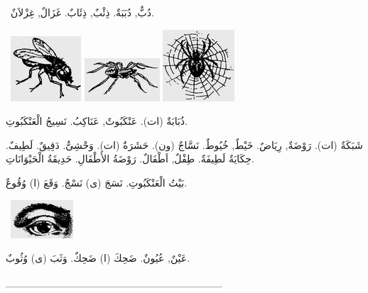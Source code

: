 \documentclass[a5paper]{article}
\begin{document}
\ دُبٌّ, دُبَبَةٌ. ذِئْبٌ, ذِئَابٌ. غَزَالٌ, غِزْلاَنٌ. 

\  \includegraphics[width=1.0311in,height=0.9583in]{MuhammadBagauddinlatinized-img118.png}   \includegraphics[width=1.1043in,height=0.6354in]{MuhammadBagauddinlatinized-img119.png}   \includegraphics[width=1.052in,height=1.052in]{MuhammadBagauddinlatinized-img120.png}  

ذُبَابَةٌ (ات). عَنْكَبُوتٌ, عَنَاكِبُ. نَسِيجُ الْعَنْكَبُوتِ. 

شَبَكَةٌ (ات). رَوْضَةٌ, رِيَاضٌ. خَيْطٌ, خُيُوطٌ. نَسَّاجٌ (ون). حَشَرَةٌ (ات). وَحْشِىٌّ. دَقِيقٌ. لَطِيفٌ. حِكَايَةٌ لَطِيفَةٌ. طِفْلٌ, اَطْفَالٌ. رَوْضَةُ الأَطْفَالِ. حَدِيقَةُ الْحَيْوَانَاتِ. 

بَيْتُ الْعَنْكَبُوتِ. نَسَجَ (ى) نَسْجٌ. وَقَعَ (ا) وُقُوعٌ. 

\  \includegraphics[width=0.9165in,height=0.5626in]{MuhammadBagauddinlatinized-img121.png} 

عَيْنٌ, عُيُونٌ. ضَحِكَ (ا) ضَحِكٌ. وَثَبَ (ى) وُثُوبٌ.

\_\_\_\_\_\_\_\_\_\_\_\_\_\_\_\_\_\_\_\_\_\_\_\_\_\_\_\_\_
\end{document}

